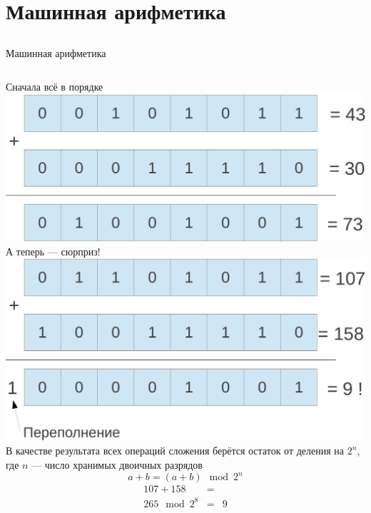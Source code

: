 \documentclass{beamer}
\begin{document}
    \section{Машинная арифметика}
    \subsection{}
    \begin{frame}{Машинная арифметика}
    \begin{columns}
    Сначала всё в порядке
    \includegraphics[width=\linewidth]{fig/sum1.pdf} \\
    \pause
    А теперь --- сюрприз!
    \includegraphics[width=\linewidth]{fig/sum2.pdf}
    \pause
        В качестве результата всех операций сложения берётся остаток от деления на $2^n$, где $n$ --- число хранимых двоичных разрядов
        $$
            a + b = (a + b) \mod 2^n
        $$
    \pause
        \begin{eqnarray*}
            107 + 158 &=& \\
            265 \mod 2^8 &=& 9
        \end{eqnarray*}
    \end{columns}
    \end{frame}
\end{document}

